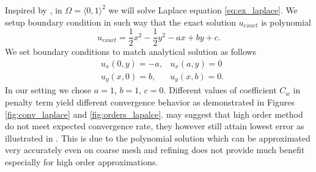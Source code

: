 \begin{example}[Diffusion 2D]
\label{ex:laplace}
Inspired by \cite[cv. 8.4 (3), p. 150]{Holubova2011}, in $\Omega = \langle 0, 1 
\rangle^2$ 
we will solve Laplace equation \eqref{eq:ex_laplace}.
We setup boundary condition in such way that the exact solution 
$u_{exact}$ is polynomial
\begin{equation}
u_{exact} = \frac{1}{2}x^2 - \frac{1}{2}y^2 - ax + by + c.
\end{equation}
We set boundary conditions to match analytical solution as follows
\begin{equation}
	\begin{aligned}
		&u_x(0, y) = -a, & u_x(a, y) = 0\\
		&u_y(x, 0) = b, & u_y(x, b) = 0.
	\end{aligned}
\end{equation}
In our setting we chose $a=1$, $b=1$, $c=0$. Different values of 
coefficient $C_w$ in penalty term yield different convergence behavior as demonstrated in 
Figures \ref{fig:conv_laplace} and \ref{fig:orders_lapalce}.   
may suggest that high order method do not meet expected convergence rate, they however 
still attain lowest error as illustrated in . This is due to 
the polynomial solution which can be approximated very accurately even on coarse mesh and 
refining does not provide much benefit especially for high order approximations.
\end{example}

